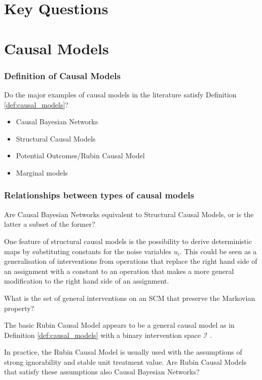 
\section{Key Questions}

\section{Causal Models}

\subsubsection{Definition of Causal Models}

\begin{question}
    Do the major examples of causal models in the literature satisfy Definition \ref{def:causal_models}?
    \begin{itemize}
        \item Causal Bayesian Networks
        \item Structural Causal Models
        \item Potential Outcomes/Rubin Causal Model
        \item Marginal models
    \end{itemize}
\end{question}

\subsubsection{Relationships between types of causal models}

\begin{question}
    Are Causal Bayesian Networks equivalent to Structural Causal Models, or is the latter a subset of the former?
\end{question}

\begin{question}
    One feature of structural causal models is the possibility to derive deterministic maps by substituting constants for the noise variables $u_i$. This could be seen as a generalisation of interventions from operations that replace the right hand side of an assignment with a constant to an operation that makes a more general modification to the right hand side of an assignment.
    
    What is the set of general interventions on an SCM that preserve the Markovian property?
\end{question}

\begin{question}
    The basic Rubin Causal Model appears to be a general causal model as in Definition \ref{def:causal_models} with a binary intervention space $\mathcal{I}$ \cite{sontag_causal_nodate}. 
    
    In practice, the Rubin Causal Model is usually used with the assumptions of strong ignorability and stable unit treatment value. Are Rubin Causal Models that satisfy these assumptions also Causal Bayesian Networks?
\end{question}

